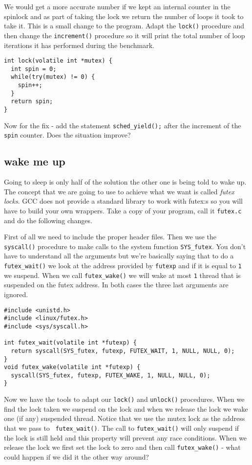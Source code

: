 \documentclass[a4paper,11pt]{article}
\begin{document}
We would get a more accurate number if we kept an internal counter in
the spinlock and as part of taking the lock we return the number of
loops it took to take it. This is a small change to the program. Adapt
the {\tt lock()} procedure and then change the {\tt increment()}
procedure so it will print the total number of loop iterations it has
performed during the benchmark.

\begin{lstlisting}
int lock(volatile int *mutex) {
  int spin = 0;
  while(try(mutex) != 0) {
    spin++;
  }
  return spin;
}
\end{lstlisting}

Now for the fix - add the statement {\tt sched\_yield();} after the
increment of the {\tt spin} counter. Does the situation improve?

\subsection{wake me up}

Going to sleep is only half of the solution the other one is being
told to wake up. The concept that we are going to use to achieve what
we want is called {\em futex locks}. GCC does not provide a standard
library to work with futex:s so you will have to build your own
wrappers. Take a copy of your program, call it {\tt futex.c} and do the
following changes.

First of all we need to include the proper header files. Then we use
the {\tt syscall()} procedure to make calls to the system function
{\tt SYS\_futex}.  You don't have to understand all the arguments but
we're basically saying that to do a {\tt futex\_wait()} we look at the
address provided by {\tt futexp} and if it is equal to {\tt 1} we
suspend. When we call {\tt futex\_wake()} we will wake at most {\tt 1}
thread that is suspended on the futex address. In both cases the three
last arguments are ignored.

\begin{lstlisting}
#include <unistd.h>
#include <linux/futex.h>
#include <sys/syscall.h>

int futex_wait(volatile int *futexp) {
  return syscall(SYS_futex, futexp, FUTEX_WAIT, 1, NULL, NULL, 0);
}
void futex_wake(volatile int *futexp) {
  syscall(SYS_futex, futexp, FUTEX_WAKE, 1, NULL, NULL, 0);
}
\end{lstlisting}

Now we have the tools to adapt our {\tt lock()} and {\tt unlock()}
procedures. When we find the lock taken we suspend on the lock and
when we release the lock we wake one (if any) suspended thread. Notice
that we use the mutex lock as the address that we pass to {\tt
 futex\_wait()}. The call to {\tt futex\_wait()} will only suspend if
the lock is still held and this property will prevent any race
conditions. When we release the lock we first set the lock to zero and
then call {\tt futex\_wake()} - what could happen if we did it the
other way around?
\end{document}
